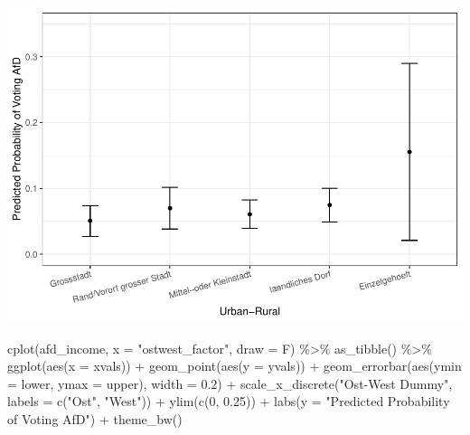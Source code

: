 \documentclass[
]{article}
\newenvironment{Shaded}{\begin{snugshade}}{\end{snugshade}}
\newcommand{\AttributeTok}[1]{\textcolor[rgb]{0.77,0.63,0.00}{#1}}
\newcommand{\DecValTok}[1]{\textcolor[rgb]{0.00,0.00,0.81}{#1}}
\newcommand{\FloatTok}[1]{\textcolor[rgb]{0.00,0.00,0.81}{#1}}
\newcommand{\FunctionTok}[1]{\textcolor[rgb]{0.00,0.00,0.00}{#1}}
\newcommand{\NormalTok}[1]{#1}
\newcommand{\SpecialCharTok}[1]{\textcolor[rgb]{0.00,0.00,0.00}{#1}}
\newcommand{\StringTok}[1]{\textcolor[rgb]{0.31,0.60,0.02}{#1}}
\begin{document}
\includegraphics{AVCD_Final_Assignment-Edenhofer_latest_files/figure-latex/afd-geography-1.pdf}

\begin{Shaded}
\begin{Highlighting}[]
\FunctionTok{cplot}\NormalTok{(afd\_income, }\AttributeTok{x =} \StringTok{"ostwest\_factor"}\NormalTok{, }\AttributeTok{draw =}\NormalTok{ F) }\SpecialCharTok{\%\textgreater{}\%}
  \FunctionTok{as\_tibble}\NormalTok{() }\SpecialCharTok{\%\textgreater{}\%}
  \FunctionTok{ggplot}\NormalTok{(}\FunctionTok{aes}\NormalTok{(}\AttributeTok{x =}\NormalTok{ xvals)) }\SpecialCharTok{+}
  \FunctionTok{geom\_point}\NormalTok{(}\FunctionTok{aes}\NormalTok{(}\AttributeTok{y =}\NormalTok{ yvals)) }\SpecialCharTok{+}
  \FunctionTok{geom\_errorbar}\NormalTok{(}\FunctionTok{aes}\NormalTok{(}\AttributeTok{ymin =}\NormalTok{ lower, }\AttributeTok{ymax =}\NormalTok{ upper), }\AttributeTok{width =} \FloatTok{0.2}\NormalTok{) }\SpecialCharTok{+}
  \FunctionTok{scale\_x\_discrete}\NormalTok{(}\StringTok{"Ost{-}West Dummy"}\NormalTok{, }\AttributeTok{labels =} \FunctionTok{c}\NormalTok{(}\StringTok{"Ost"}\NormalTok{, }\StringTok{"West"}\NormalTok{)) }\SpecialCharTok{+}
  \FunctionTok{ylim}\NormalTok{(}\FunctionTok{c}\NormalTok{(}\DecValTok{0}\NormalTok{, }\FloatTok{0.25}\NormalTok{)) }\SpecialCharTok{+}
  \FunctionTok{labs}\NormalTok{(}\AttributeTok{y =} \StringTok{"Predicted Probability of Voting AfD"}\NormalTok{) }\SpecialCharTok{+}
  \FunctionTok{theme\_bw}\NormalTok{()}
\end{Highlighting}
\end{Shaded}
\end{document}
